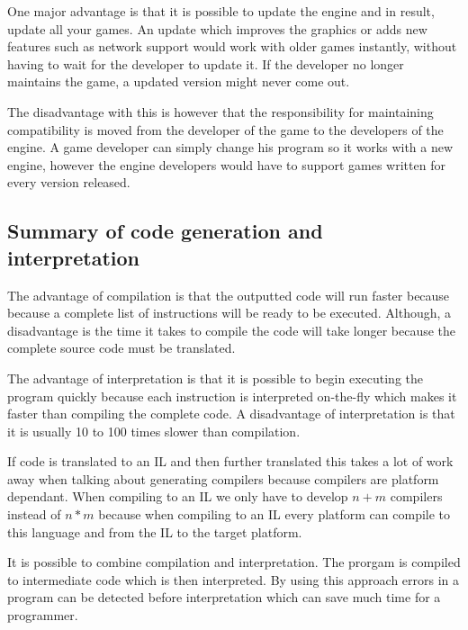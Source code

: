 One major advantage is that it is possible to update the engine and in result,
update all your games.  An update which improves the graphics or adds new
features such as network support would work with older games instantly, without
having to wait for the developer to update it.  If the developer no longer
maintains the game, a updated version might never come out.

The disadvantage with this is however that the responsibility for maintaining
compatibility is moved from the developer of the game to the developers of the
engine. A game developer can simply change his program so it works with a new
engine, however the engine developers would have to support games written for
every version released.

\subsection{Summary of code generation and interpretation}
The advantage of compilation is that the outputted code will run faster because
because a complete list of instructions will be ready to be executed. Although,
a disadvantage is the time it takes to compile the code will take longer because
the complete source code must be translated.

The advantage of interpretation is that it is possible to begin executing the
program quickly because each instruction is interpreted on-the-fly which makes
it faster than compiling the complete code. A disadvantage of interpretation is
that it is usually 10 to 100 times slower than compilation.

If code is translated to an IL and then further translated this takes a lot of
work away when talking about generating compilers because compilers are platform
dependant. When compiling to an IL we only have to develop $n+m$ compilers
instead of $n*m$ because when compiling to an IL every platform can compile to
this language and from the IL to the target platform.

It is possible to combine compilation and interpretation. The prorgam is
compiled to intermediate code which is then interpreted. By using this approach
errors in a program can be detected before interpretation which can save much
time for a programmer.
